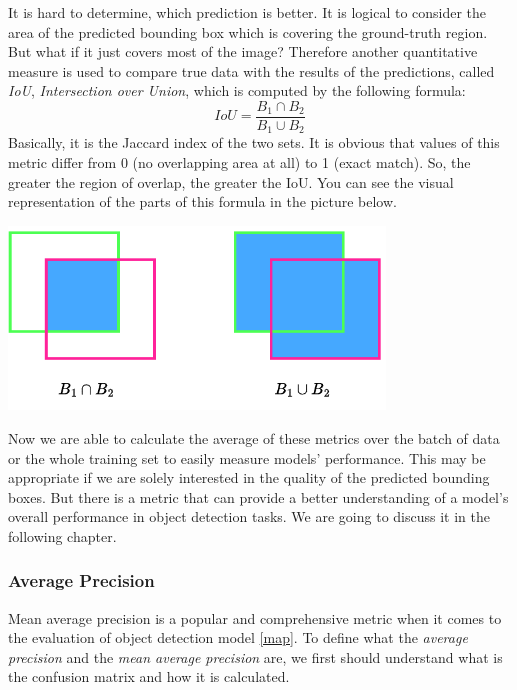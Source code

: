 \documentclass[14pt,a4paper]{extarticle}
\newcounter{e}
\newcounter{pic}
\numberwithin{equation}{section}
\numberwithin{figure}{section}
\begin{document}
It is hard to determine, which prediction is better. It is logical to consider the area of the predicted bounding box which is covering the ground-truth region. But what if it just covers most of the image? Therefore another quantitative measure is used to compare true data with the results of the predictions, called \textit{IoU}, \textit{Intersection over Union}, which is computed by the following formula:
\begin{equation}
    IoU = \frac{B_1 \cap B_2}{B_1 \cup B_2}
\end{equation}
Basically, it is the Jaccard index of the two sets.
It is obvious that values of this metric differ from 0 (no overlapping area at all) to 1 (exact match). So, the greater the region of overlap, the greater the IoU. You can see the visual representation of the parts of this formula in the picture below.

\begin{center}
    \includegraphics[width=10cm]{images/iou.pdf}
\end{center}

Now we are able to calculate the average of these metrics over the batch of data or the whole training set to easily measure models' performance. This may be  appropriate if we are solely interested in the quality of the predicted bounding boxes. But there is a metric that can provide a better understanding of a model's overall performance in object detection tasks. We are going to discuss it in the following chapter.

        
        \subsubsection{Average Precision}
Mean average precision is a popular and comprehensive metric when it comes to the evaluation of object detection model \ref{map}.
To define what the \textit{average precision} and the \textit{mean average precision} are, we first should understand what is the confusion matrix and how it is calculated.
\end{document}
